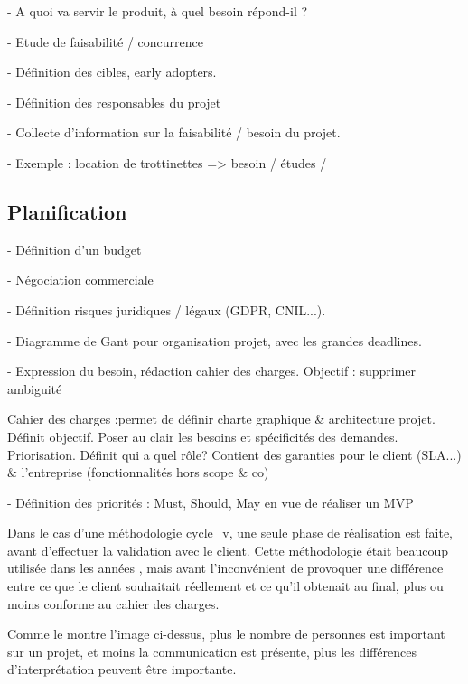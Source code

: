 - A quoi va servir le produit, à quel besoin répond-il ?

- Etude de faisabilité / concurrence

- Définition des cibles, early adopters.

- Définition des responsables du projet

- Collecte d'information sur la faisabilité / besoin du projet.

- Exemple : location de trottinettes => besoin / études /



\subsection{Planification}

- Définition d'un budget

- Négociation commerciale

- Définition risques juridiques / légaux (GDPR, CNIL...).

- Diagramme de Gant pour organisation projet, avec les grandes deadlines.

- Expression du besoin, rédaction cahier des charges. Objectif : supprimer ambiguité

Cahier des charges :permet de définir charte graphique \& architecture projet. Définit objectif. Poser au clair les besoins et spécificités des demandes. Priorisation. Définit qui a quel rôle? Contient des garanties pour le client (SLA...) \& l'entreprise (fonctionnalités hors scope \& co)

- Définition des priorités : Must, Should, May en vue de réaliser un MVP

Dans le cas d'une méthodologie \gls{cycle_v}, une seule phase de réalisation est faite, avant d'effectuer la validation avec le client. Cette méthodologie était beaucoup utilisée dans les années , mais avant l'inconvénient de provoquer une différence entre ce que le client souhaitait réellement et ce qu'il obtenait au final, plus ou moins conforme au cahier des charges. 


Comme le montre l'image ci-dessus, plus le nombre de personnes est important sur un projet, et moins la communication est présente, plus les différences d'interprétation peuvent être importante. 

